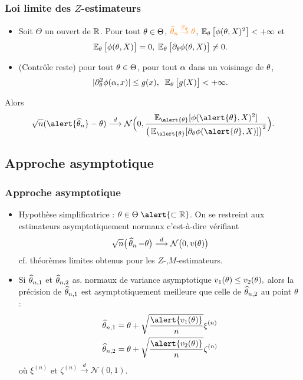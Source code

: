 \begin{frame}
\frametitle{Loi limite des $Z$-estimateurs}
\begin{prop}
\begin{itemize}
\item Soit $\Theta$ un ouvert de $\operatorname{{\mathbb R}}$. Pour tout $\theta\in \Theta$, $\tco{\est \stackrel{\PP_\truetheta}{\rightarrow} \truetheta}$, $\operatorname{{\mathbb E}}_\theta\big[\phi(\theta,X)^2\big]<+\infty$
et
$$\operatorname{{\mathbb E}}_\theta\big[\phi(\theta,X)\big]=0,\;\operatorname{{\mathbb E}}_\theta\big[\partial_\theta\phi(\theta, X)\big]\neq 0.$$
\item \alert{(Contrôle reste)} pour tout $\theta\in\Theta$, pour tout $\alpha$ \alert{dans un voisinage de $\theta$},
$$|\partial^2_\theta\phi(\alpha,x)|\leq g(x),\;\;\operatorname{{\mathbb E}}_\theta\big[g(X)\big]<+\infty.$$
\end{itemize}
Alors
$$\sqrt{n}(\alert{\est}-\truetheta) \stackrel{d}{\longrightarrow} {\mathcal N}\Big(0,\frac{\E_{\alert{\truetheta}}[\phi(\alert{\truetheta},X)^2]}{\big(\E_{\alert{\truetheta}}[\partial_{\truetheta}\phi(\alert{\truetheta}, X)]\big)^2}\Big).$$
\end{prop}
\end{frame}


\subsection{Approche asymptotique}

\begin{frame}
\frametitle{Approche asymptotique}
\begin{itemize}
\item Hypothèse simplificatrice : $\truetheta \in \Theta\; \alert{\subset \R}$. On se restreint aux \alert{ estimateurs asymptotiquement normaux} c'est-à-dire vérifiant
$$\sqrt{n}\big(\operatorname{\widehat \theta_{\mathnormal{n}}} - \theta\big) \stackrel{d}{\longrightarrow} {\mathcal N}\big(0,v(\theta)\big)$$
cf. théorèmes limites obtenus pour les $Z$-,$M$-estimateurs.
\item Si $\widehat {\theta}_{n,1}$ et $\widehat {\theta}_{n,2}$ as. normaux de variance asymptotique
 $v_1(\theta) \leq v_2(\theta),$ alors la précision de $\widehat {\theta}_{n,1}$ est \alert{asymptotiquement meilleure} que celle de $\widehat {\theta}_{n,2}$ au point $\theta$ :
\begin{align*}
\widehat \truetheta_{n,1} & = \truetheta+\sqrt{\frac{\alert{v_1(\truetheta)}}{n}}\xi^{(n)}\\
\widehat \truetheta_{n,2} & = \truetheta+\sqrt{\frac{\alert{v_2(\truetheta)}}{n}}\zeta^{(n)}
\end{align*}
où $\xi^{(n)}$ et $\zeta^{(n)} \stackrel{d}{\rightarrow} {\mathcal N}(0,1)$.
\end{itemize}
\end{frame}

